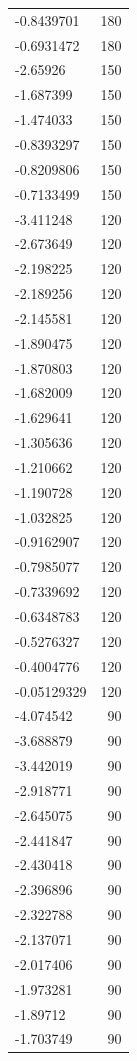 \begin{table}[ht]
\begin{tabular}{lr}
  -0.8439701 & 180 \\ 
  -0.6931472 & 180 \\ 
  -2.65926 & 150 \\ 
  -1.687399 & 150 \\ 
  -1.474033 & 150 \\ 
  -0.8393297 & 150 \\ 
  -0.8209806 & 150 \\ 
  -0.7133499 & 150 \\ 
  -3.411248 & 120 \\ 
  -2.673649 & 120 \\ 
  -2.198225 & 120 \\ 
  -2.189256 & 120 \\ 
  -2.145581 & 120 \\ 
  -1.890475 & 120 \\ 
  -1.870803 & 120 \\ 
  -1.682009 & 120 \\ 
  -1.629641 & 120 \\ 
  -1.305636 & 120 \\ 
  -1.210662 & 120 \\ 
  -1.190728 & 120 \\ 
  -1.032825 & 120 \\ 
  -0.9162907 & 120 \\ 
  -0.7985077 & 120 \\ 
  -0.7339692 & 120 \\ 
  -0.6348783 & 120 \\ 
  -0.5276327 & 120 \\ 
  -0.4004776 & 120 \\ 
  -0.05129329 & 120 \\ 
  -4.074542 &  90 \\ 
  -3.688879 &  90 \\ 
  -3.442019 &  90 \\ 
  -2.918771 &  90 \\ 
  -2.645075 &  90 \\ 
  -2.441847 &  90 \\ 
  -2.430418 &  90 \\ 
  -2.396896 &  90 \\ 
  -2.322788 &  90 \\ 
  -2.137071 &  90 \\ 
  -2.017406 &  90 \\ 
  -1.973281 &  90 \\ 
  -1.89712 &  90 \\ 
  -1.703749 &  90 \\ 

\end{tabular}
\end{table}
